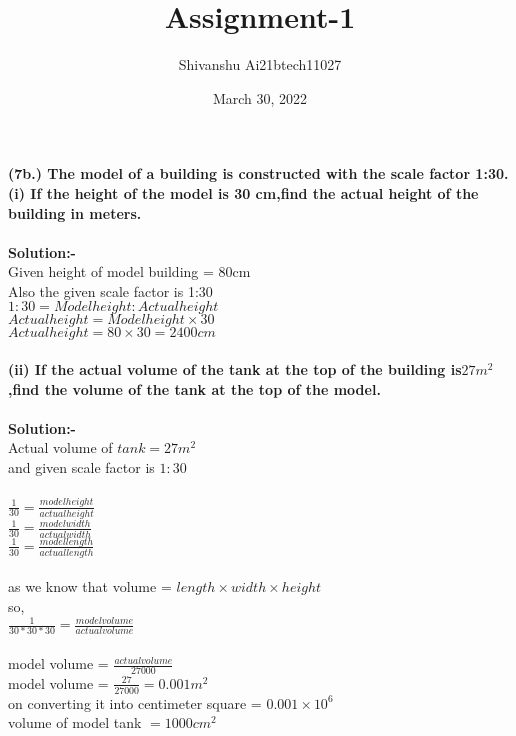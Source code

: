 \documentclass[12pt,twocolumn]{article}
\title{\textbf{Assignment-1}}
\author{Shivanshu     Ai21btech11027}
\date{March 30, 2022}
\begin{document}
\maketitle
\textbf{(7b.)\hspace{1mm} The model of a building is constructed with the scale factor 1:30.}\\

\textbf{(i) If the height of the model is 30 cm,find the actual height of the building in meters.}\\
\vspace{1mm}\\
\textbf{Solution:-}\\
Given height of model building = 80cm\\
Also the given scale factor is 1:30\\
\rightarrow $1 : 30 = Model height : Actual height$\\
\rightarrow $Actual height = Model height\times 30$\\
\rightarrow$ Actual height = 80 \times 30 = 2400 cm $\\
\vspace{2mm}\\
\textbf{(ii) If the actual volume of the tank at the top of the building is$ 27m^2 $,find the volume of the tank at the top of the model.}\\
\vspace{1mm}\\
\textbf{Solution:-}\\
Actual volume of $tank = 27m^2 $\\
 and given  scale factor is $ 1:30 $\\
\vspace{1mm}\\
$\frac{1}{30} = \frac{model height}{actual height}$ \\
$\frac{1}{30} = \frac{model width}{actual width}$ \\
$\frac{1}{30} = \frac{model length}{actual length} $\\
\vspace{1mm}\\
as we know that volume = $length\times width\times height$\\
so, \\
$\frac{1}{30*30*30} = \frac{model volume}{actual volume} $\\
\vspace{1mm}\\
model volume = $\frac{actual volume}{27000} $\\
model volume = $\frac{27}{27000} = 0.001m^2$\\
on converting it into centimeter square = $0.001 \times 10^6$\\
volume of model tank $= 1000 cm^2$\\
\end{document}
